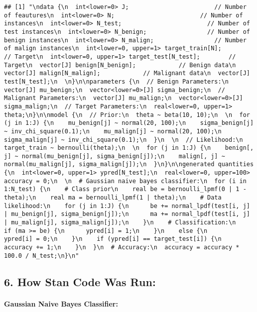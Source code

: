 \documentclass[
]{article}
\begin{document}
\begin{verbatim}
## [1] "\ndata {\n  int<lower=0> J;                        // Number of feautures\n  int<lower=0> N;                        // Number of instances\n  int<lower=0> N_test;                        // Number of test instances\n  int<lower=0> N_benign;                 // Number of benign instances\n  int<lower=0> N_malign;                 // Number of malign instances\n  int<lower=0, upper=1> target_train[N];        // Target\n  int<lower=0, upper=1> target_test[N_test];        // Target\n  vector[J] benign[N_benign];            // Benign data\n  vector[J] malign[N_malign];            // Malignant data\n  vector[J] test[N_test];\n  \n}\n\nparameters {\n  // Benign Parameters:\n  vector[J] mu_benign;\n  vector<lower=0>[J] sigma_benign;\n  // Malignant Parameters:\n  vector[J] mu_malign;\n  vector<lower=0>[J] sigma_malign;\n  // Target Parameters:\n  real<lower=0, upper=1> theta;\n}\n\nmodel {\n  // Prior:\n  theta ~ beta(10, 10);\n  \n  for (j in 1:J) {\n    mu_benign[j] ~ normal(20, 100);\n    sigma_benign[j] ~ inv_chi_square(0.1);\n    mu_malign[j] ~ normal(20, 100);\n    sigma_malign[j] ~ inv_chi_square(0.1);\n  }\n  \n  // Likelihood:\n  target_train ~ bernoulli(theta);\n  \n  for (j in 1:J) {\n    benign[, j] ~ normal(mu_benign[j], sigma_benign[j]);\n    malign[, j] ~ normal(mu_malign[j], sigma_malign[j]);\n  }\n}\n\ngenerated quantities {\n  int<lower=0, upper=1> ypred[N_test];\n  real<lower=0, upper=100> accuracy = 0;\n  \n  # Gaussian naive bayes classifier:\n  for (i in 1:N_test) {\n    # Class prior\n    real be = bernoulli_lpmf(0 | 1 - theta);\n    real ma = bernoulli_lpmf(1 | theta);\n    # Data likelihood:\n    for (j in 1:J) {\n      be += normal_lpdf(test[i, j] | mu_benign[j], sigma_benign[j]);\n      ma += normal_lpdf(test[i, j] | mu_malign[j], sigma_malign[j]);\n    }\n    # Classification:\n    if (ma >= be) {\n      ypred[i] = 1;\n    }\n    else {\n      ypred[i] = 0;\n    }\n    if (ypred[i] == target_test[i]) {\n      accuracy += 1;\n    }\n  }\n  # Accuracy:\n  accuracy = accuracy * 100.0 / N_test;\n}\n"
\end{verbatim}

\hypertarget{how-stan-code-was-run}{%
\subsection{6. How Stan Code Was Run:}\label{how-stan-code-was-run}}

\hypertarget{gaussian-naive-bayes-classifier-2}{%
\paragraph{Gaussian Naive Bayes
Classifier:}\label{gaussian-naive-bayes-classifier-2}}
\end{document}
